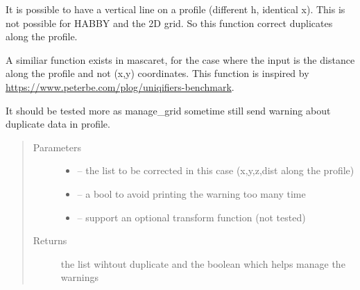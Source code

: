 \documentclass[letterpaper,10pt,english]{sphinxmanual}
\begin{document}
\begin{fulllineitems}
\label{\detokenize{index:src.rubar.correct_duplicate_xy}}
It is possible to have a vertical line on a profile (different h, identical x). This is not possible for HABBY and
the 2D grid. So this function correct duplicates along the profile.

A similiar function exists in mascaret, for the case where the input is the distance along the profile and not
(x,y) coordinates. This function is inspired by \url{https://www.peterbe.com/plog/uniqifiers-benchmark}.

It should be tested more as manage\_grid sometime still send warning about duplicate data in profile.
\begin{quote}\begin{description}
\item[{Parameters}] \leavevmode\begin{itemize}
\item {} 
 -- the list to be corrected in this case (x,y,z,dist along the profile)

\item {} 
 -- a bool to avoid printing the warning too many time

\item {} 
 -- support an optional transform function (not tested)

\end{itemize}

\item[{Returns}] \leavevmode
the list wihtout duplicate and the boolean which helps manage the warnings

\end{description}\end{quote}

\end{fulllineitems}

\end{document}
